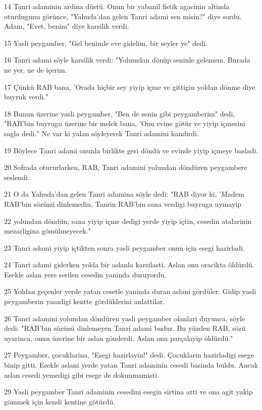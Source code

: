 \par 14 Tanri adaminin ardina düstü. Onun bir yabanil fistik agacinin altinda oturdugunu görünce, "Yahuda'dan gelen Tanri adami sen misin?" diye sordu. Adam, "Evet, benim" diye karsilik verdi.
\par 15 Yasli peygamber, "Gel benimle eve gidelim, bir seyler ye" dedi.
\par 16 Tanri adami söyle karsilik verdi: "Yolumdan dönüp seninle gelemem. Burada ne yer, ne de içerim.
\par 17 Çünkü RAB bana, 'Orada hiçbir sey yiyip içme ve gittigin yoldan dönme diye buyruk verdi."
\par 18 Bunun üzerine yasli peygamber, "Ben de senin gibi peygamberim" dedi, "RAB'bin buyrugu üzerine bir melek bana, 'Onu evine götür ve yiyip içmesini sagla dedi." Ne var ki yalan söyleyerek Tanri adamini kandirdi.
\par 19 Böylece Tanri adami onunla birlikte geri döndü ve evinde yiyip içmeye basladi.
\par 20 Sofrada otururlarken, RAB, Tanri adamini yolundan döndüren peygambere seslendi.
\par 21 O da Yahuda'dan gelen Tanri adamina söyle dedi: "RAB diyor ki, 'Madem RAB'bin sözünü dinlemedin, Tanrin RAB'bin sana verdigi buyruga uymayip
\par 22 yolundan döndün; sana yiyip içme dedigi yerde yiyip içtin, cesedin atalarinin mezarligina gömülmeyecek."
\par 23 Tanri adami yiyip içtikten sonra yasli peygamber onun için esegi hazirladi.
\par 24 Tanri adami giderken yolda bir aslanla karsilasti. Aslan onu oracikta öldürdü. Esekle aslan yere serilen cesedin yaninda duruyordu.
\par 25 Yoldan geçenler yerde yatan cesetle yaninda duran aslani gördüler. Gidip yasli peygamberin yasadigi kentte gördüklerini anlattilar.
\par 26 Tanri adamini yolundan döndüren yasli peygamber olanlari duyunca, söyle dedi: "RAB'bin sözünü dinlemeyen Tanri adami budur. Bu yüzden RAB, sözü uyarinca, onun üzerine bir aslan gönderdi. Aslan onu parçalayip öldürdü."
\par 27 Peygamber, çocuklarina, "Esegi hazirlayin!" dedi. Çocuklarin hazirladigi esege binip gitti. Esekle aslani yerde yatan Tanri adaminin cesedi basinda buldu. Ancak aslan cesedi yemedigi gibi esege de dokunmamisti.
\par 29 Yasli peygamber Tanri adaminin cesedini esegin sirtina atti ve ona agit yakip gömmek için kendi kentine götürdü.
